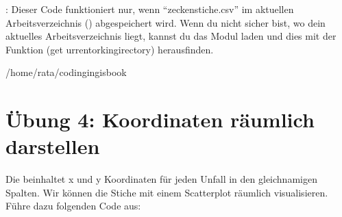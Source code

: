 \documentclass[letterpaper,10pt,english]{sphinxmanual}
\begin{document}
\begin{sphinxVerbatim}[commandchars=\\\{\}]
  
\end{sphinxVerbatim}

: Dieser Code funktioniert nur, wenn “zeckenstiche.csv” im aktuellen Arbeitsverzeichnis () abgespeichert wird. Wenn du nicht sicher bist, wo dein aktuelles Arbeitsverzeichnis liegt, kannst du das Modul  laden und dies mit der Funktion  (get urrentorkingirectory) herausfinden.

\begin{sphinxVerbatim}[commandchars=\\\{\}]
 

\end{sphinxVerbatim}

\begin{sphinxVerbatim}[commandchars=\\\{\}]
\PYGZsq{}/home/rata/codingingis\PYGZus{}book\PYGZsq{}
\end{sphinxVerbatim}


\section{Übung 4: Koordinaten räumlich darstellen}
\label{\detokenize{01_04_Tabellarische_Daten:ubung-4-koordinaten-raumlich-darstellen}}
Die   beinhaltet x und y Koordinaten für jeden Unfall in den gleichnamigen Spalten. Wir können die Stiche mit einem Scatterplot räumlich visualisieren. Führe dazu folgenden Code aus:

\begin{sphinxVerbatim}[commandchars=\\\{\}]
\end{sphinxVerbatim}
\end{document}

